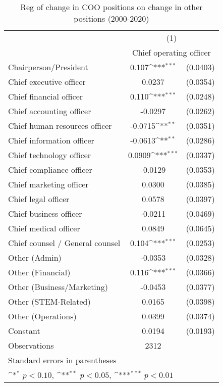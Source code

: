 \begin{table}[htbp]\centering
\def\sym#1{\ifmmode^{#1}\else\(^{#1}\)\fi}
\caption{Reg of change in COO positions on change in other positions (2000-2020)}
\begin{tabular}{l*{1}{cc}}
\toprule
                &\multicolumn{2}{c}{(1)}     \\
                &\multicolumn{2}{c}{Chief operating officer}\\
\midrule
Chairperson/President&    0.107\sym{***}& (0.0403)\\
Chief executive officer&   0.0237         & (0.0354)\\
Chief financial officer&    0.110\sym{***}& (0.0248)\\
Chief accounting officer&  -0.0297         & (0.0262)\\
Chief human resources officer&  -0.0715\sym{**} & (0.0351)\\
Chief information officer&  -0.0613\sym{**} & (0.0286)\\
Chief technology officer&   0.0909\sym{***}& (0.0337)\\
Chief compliance officer&  -0.0129         & (0.0353)\\
Chief marketing officer&   0.0300         & (0.0385)\\
Chief legal officer&   0.0578         & (0.0397)\\
Chief business officer&  -0.0211         & (0.0469)\\
Chief medical officer&   0.0849         & (0.0645)\\
Chief counsel / General counsel&    0.104\sym{***}& (0.0253)\\
Other (Admin)   &  -0.0353         & (0.0328)\\
Other (Financial)&    0.116\sym{***}& (0.0366)\\
Other (Business/Marketing)&  -0.0453         & (0.0377)\\
Other (STEM-Related)&   0.0165         & (0.0398)\\
Other (Operations)&   0.0399         & (0.0374)\\
Constant        &   0.0194         & (0.0193)\\
\midrule
Observations    &     2312         &         \\
\bottomrule
\multicolumn{3}{l}{\footnotesize Standard errors in parentheses}\\
\multicolumn{3}{l}{\footnotesize \sym{*} \(p<0.10\), \sym{**} \(p<0.05\), \sym{***} \(p<0.01\)}\\
\end{tabular}
\end{table}
